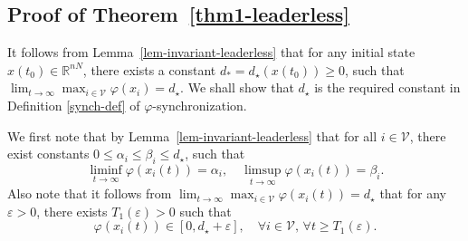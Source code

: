 \documentclass[a4paper, 11pt]{article}
\def\R{\mathbb{R}}
\newcommand{\eps}{\varepsilon}
\begin{document}
\subsection{Proof of Theorem~\ref{thm1-leaderless}}\label{proof-thm1-leaderless}
It follows from Lemma~\ref{lem-invariant-leaderless} that for any initial state $x(t_0) \in {\R}^{nN}$,
there exists a constant $d_*=d_\star(x(t_0)) \geq 0$, such that $\lim_{t \rightarrow \infty} \max_{i \in \mathcal{V}} \varphi(x_i) =d_\star$. We shall show that $d_\star$ is the required constant in Definition \ref{synch-def} of $\varphi$-synchronization.

We first note that by Lemma~\ref{lem-invariant-leaderless} that for all $i \in \mathcal{V}$, there exist constants $0 \leq \alpha_i \leq \beta_i \leq d_\star$,
such that
\[
\liminf_{t \rightarrow \infty} \varphi(x_i(t))=\alpha_i, \quad \limsup_{t \rightarrow \infty} \varphi(x_i(t))=\beta_i.
\]
Also note that it follows from $\lim_{t \rightarrow \infty}  \max_{i \in \mathcal{V}}\varphi(x_i(t))=d_\star$ that for any $\eps>0$, there exists $T_1(\eps)>0$ such that
\begin{equation}\label{bound-T1}
\varphi(x_i(t)) \in [0, d_\star+\eps], \quad \forall i \in \mathcal{V}, \, \forall t \geq T_1(\eps).
\end{equation}
\end{document}
